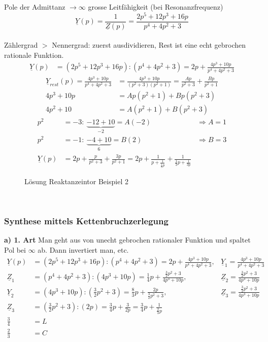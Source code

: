 Pole der Admittanz $\rightarrow \infty$ grosse Leitfähigkeit (bei
Resonanzfrequenz)\\
$$\underline{Y}(p)=\frac{1}{\underline{Z}(p)}=\frac{2p^5+12p^3+16p}{p^4+4p^2+3}$$\\
Zählergrad $>$ Nennergrad: zuerst ausdividieren, Rest ist eine echt gebrochen
rationale Funktion.\\
\begin{align}
\underline{Y}(p)&=(2p^5+12p^3+16p):(p^4+4p^2+3)=2p+\frac{4p^3+10p}{p^4+4p^2+3}\nonumber
\end{align}
\begin{align}
\underline{Y}_{rest}(p)=\frac{4p^3+10p}{p^4+4p^2+3}&=\frac{4p^3+10p}{(p^2+3)(p^2+1)}=\frac{Ap}{p^2+3}+\frac{Bp}{p^2+1}\nonumber\\
4p^3+10p&=Ap(p^2+1)+Bp(p^2+3)\nonumber\\
4p^2+10&=A(p^2+1)+B(p^2+3)\nonumber
\end{align}
\begin{align}
p^2&=-3:\ \underbrace{-12+10}_{-2}=A(-2) &\Rightarrow A=1\nonumber\\
p^2&=-1:\ \underbrace{-4+10}_{6}=B(2) &\Rightarrow B=3\nonumber\\
\underline{Y}(p)&=2p+\frac{p}{p^2+3}+\frac{3p}{p^2+1}=2p+\frac{1}{p+\frac{1}{\frac{1}{3}p}}+\frac{1}{\frac{1}{3}p+\frac{1}{3p}}\nonumber
\end{align}
\begin{figure}[!h]
	\centering
	
	\caption{Lösung Reaktanzeintor Beispiel 2}
	\label{fig:RetSyntheseBsp2L}
\end{figure}\\


\subsubsection{Synthese mittels Kettenbruchzerlegung}
\textbf{a) 1. Art} Man geht aus von unecht gebrochen rationaler Funktion und
spaltet Pol bei $\infty$ ab. Dann invertiert man, etc.\\
\begin{align}
	\underline{Y}(p)&=(2p^5+12p^3+16p):(p^4+4p^2+3)=2p+\frac{4p^3+10p}{p^4+4p^2+3},
	&\underline{Y}_1=\frac{4p^3+10p}{p^4+4p^2+3}\nonumber\\
	\underline{Z}_1&=(p^4+4p^2+3):(4p^3+10p)=\frac{1}{4}p+\frac{\frac{3}{2}p^2+3}{4p^3+10p},
	&\underline{Z}_2=\frac{\frac{3}{2}p^2+3}{4p^3+10p}\nonumber\\
	\underline{Y}_2&=(4p^3+10p):(\frac{3}{2}p^2+3)=\frac{8}{3}p+\frac{2p}{\frac{3}{2}p^2+3},
	&\underline{Z}_3=\frac{\frac{3}{2}p^2+3}{4p^3+10p}\nonumber\\
	\underline{Z}_3&=(\frac{3}{2}p^2+3):(2p)=\frac{3}{4}p+\frac{3}{2p}=\frac{3}{4}p+\frac{1}{\frac{2}{3}p}\nonumber\\ \frac{3}{4}&=L\nonumber\\
	\frac{2}{3}&=C\nonumber
\end{align}